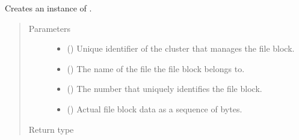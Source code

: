 \documentclass[letterpaper,10pt,english]{sphinxmanual}
\begin{document}
\begin{fulllineitems}
\begin{fulllineitems}
\end{fulllineitems}


\begin{fulllineitems}
\label{\detokenize{app.domain.helpers:app.domain.helpers.smart_dataclasses.FileBlockData.__init__}}
Creates an instance of .
\begin{quote}\begin{description}
\item[{Parameters}] \leavevmode\begin{itemize}
\item {} 
 () \textendash{} Unique identifier of the cluster that manages the file block.

\item {} 
 () \textendash{} The name of the file the file block belongs to.

\item {} 
 () \textendash{} The number that uniquely identifies the file block.

\item {} 
 () \textendash{} Actual file block data as a sequence of bytes.

\end{itemize}

\item[{Return type}] \leavevmode
{}

\end{description}\end{quote}


\end{fulllineitems}
\end{fulllineitems}
\end{document}
